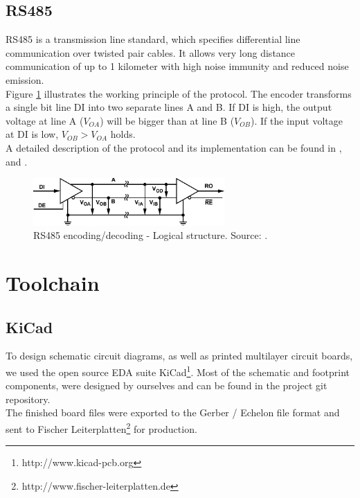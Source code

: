 \documentclass[a4paper]{scrreprt}
\begin{document}
\subsection{RS485}
RS485 is a transmission line standard, which specifies differential line communication over twisted pair cables.
It allows very long distance communication of up to 1 kilometer with high noise immunity and reduced noise emission.\\
Figure \ref{fig:rs485} illustrates the working principle of the protocol.
The encoder transforms a single bit line DI into two separate lines A and B.
If DI is high, the output voltage at line A ($V_{OA}$) will be bigger than at line B ($V_{OB}$).
If the input voltage at DI is low, $V_{OB}>V_{OA}$ holds.\\
A detailed description of the protocol and its implementation can be found in \cite{rs485}, \cite{st485} and \cite{st485appnote}.
\null
\vfill
\begin{figure}[htbp]
	\centering
	\includegraphics[width=0.65\textwidth]{img/rs485.pdf}
  \caption{RS485 encoding/decoding - Logical structure. Source: \cite{rs485}.}
	\label{fig:rs485}
\end{figure}
\section{Toolchain}
\subsection{KiCad}
To design schematic circuit diagrams, as well as printed multilayer circuit boards, we used the open source EDA suite KiCad\footnote{http://www.kicad-pcb.org}. Most of the schematic and footprint components, were designed by ourselves and can be found in the project git repository.\\
The finished board files were exported to the Gerber / Echelon file format and sent to Fischer Leiterplatten\footnote{http://www.fischer-leiterplatten.de} for production.
\end{document}
